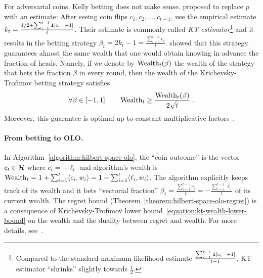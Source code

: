 For adversarial coins, Kelly betting does not make sense.
\citet{Krichevsky-Trofimov-1981} proposed to replace $p$ with an estimate:
After seeing coin flips $c_1, c_2, \dots, c_{t-1}$, use the empirical
estimate $k_t = \frac{1/2 + \sum_{i=1}^{t-1} \mathbf{1}[c_i = +1]}{t}$. Their
estimate is commonly called \emph{KT estimator}\footnote{Compared to the
standard maximum likelihood estimate $\frac{\sum_{i=1}^{t-1} \mathbf{1}[c_i =
+1]}{t-1}$, KT estimator ``shrinks'' slightly towards $\frac{1}{2}$.} and it
results in the betting strategy $\beta_t = 2k_t - 1 = \tfrac{\sum_{i=1}^{t-1}
c_i}{t}$.  \citeauthor{Krichevsky-Trofimov-1981} showed that this strategy
guarantees almost the same wealth that one would obtain knowing in advance the
fraction of heads. Namely, 
if we denote by $\operatorname{Wealth}_t(\beta)$ the wealth of the strategy that bets the fraction
$\beta$ in every round, then the wealth of the Krichevsky-Trofimov betting strategy
satisfies
\begin{equation}
\label{equation:kt-wealth-lower-bound}
\forall \beta \in [-1,1] \qquad \operatorname{Wealth}_t \ge \frac{\operatorname{Wealth}_t(\beta)}{2\sqrt{t}} \; .
\end{equation}
Moreover, this guarantee is optimal up to constant multiplicative factors~\citep{Cesa-Bianchi-Lugosi-2006}.

\paragraph{From betting to \ac{OLO}.}
In Algorithm~\ref{algorithm:hilbert-space-olo}, the ``coin outcome'' is the
vector $c_t \in \mathcal{H}$ where $c_t = -\ell_t$ and algorithm's wealth is $\operatorname{Wealth}_t
= 1 + \sum_{i=1}^t \langle c_i, w_i \rangle = 1 - \sum_{i=1}^t \langle \ell_i,
w_i \rangle$.  The algorithm explicitly keeps track of its wealth and it bets
``vectorial fraction'' $\beta_t = \tfrac{\sum_{i=1}^{t-1} c_i}{t} = -
\tfrac{\sum_{i=1}^{t-1}\ell_i}{t}$ of its current wealth. The regret bound
(Theorem~\ref{theorem:hilbert-space-olo-regret}) is a consequence of
Krichevsky-Trofimov lower bound~\eqref{equation:kt-wealth-lower-bound} on the
wealth and the duality between regret and wealth.  For more details,
see~\cite{Orabona-Pal-2016-parameter-free}.
